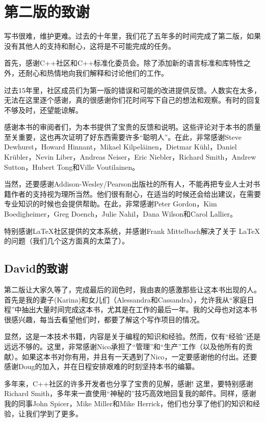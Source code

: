 \chapter{第二版的致谢}

写书很难，维护更难。过去的十年里，我们花了五年多的时间完成了第二版，如果没有其他人的支持和耐心，这将是不可能完成的任务。

首先，感谢C++社区和C++标准化委员会。除了添加新的语言标准和库特性之外，还耐心和热情地向我们解释和讨论他们的工作。

过去15年里，社区成员们为第一版的错误和可能的改进提供反馈。人数实在太多，无法在这里逐个感谢，真的很感谢你们花时间写下自己的想法和观察。有时的回复不够及时，还望能谅解。

感谢本书的审阅者们，为本书提供了宝贵的反馈和说明。这些评论对于本书的质量至关重要，这也再次证明了好东西需要许多“聪明人”。在此，非常感谢Steve Dewhurst，Howard Hinnant，Mikael Kilpel{\"a}inen，Dietmar K{\"u}hl，Daniel Kr{\"u}bler，Nevin Liber，Andreas Neiser，Eric Niebler，Richard Smith，Andrew Sutton，Hubert Tong和Ville Voutilainen。

当然，还要感谢Addison-Wesley/Pearson出版社的所有人，不能再把专业人士对书籍作者的支持视为理所当然。他们很有耐心，在适当的时候还会给出建议，在需要专业知识的时候也会提供帮助。在此，非常感谢Peter Gordon，Kim Boedigheimer，Greg Doench，Julie Nahil，Dana
Wilson和Carol Lallier。

特别感谢LaTeX社区提供的文本系统，并感谢Frank Mittelbach解决了关于 \LaTeX 的问题（我们几个这方面真的太菜了）。

\section*{David的致谢}

第二版让大家久等了，完成最后的润色时，我由衷的感激那些让这本书出现的人。首先是我的妻子(Karina)和女儿们（Alessandra和Cassandra），允许我从“家庭日程”中抽出大量时间完成这本书，尤其是在工作的最后一年。我的父母也对这本书很感兴趣，每当去看望他们时，都要了解这个写作项目的情况。

显然，这是一本技术书籍，内容是关于编程的知识和经验。然而，仅有“经验”还是远远不够的。这里，非常感谢Nico承担了“管理”和“生产”工作（以及他所有的贡献）。如果这本书对你有用，并且有一天遇到了Nico，一定要感谢他的付出。还要感谢Doug的加入，并在日程安排艰难的时刻坚持本书的编纂。

多年来，C++社区的许多开发者也分享了宝贵的见解，感谢! 这里，要特别感谢Richard Smith，多年来一直使用“神秘的”技巧高效地回复我的邮件。同样，感谢我的同事John Spicer，Mike Miller和Mike Herrick，他们也分享了他们的知识和经验，让我们学到了更多。

